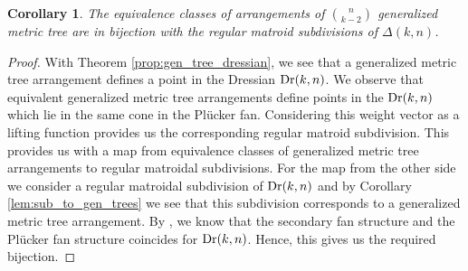\documentclass[12pt]{article}
\DeclareMathOperator{\Dr}{\rm Dr}
\theoremstyle{plain}
\newtheorem{corollary}[theorem]{Corollary}
\theoremstyle{definition}
\numberwithin{subcase}{case}
\begin{document}
\begin{corollary}
The equivalence classes of arrangements of $\binom{n}{k-2}$ generalized metric tree are in bijection with the regular matroid subdivisions of $\Delta(k,n)$.
\end{corollary}

\begin{proof}
With Theorem \ref{prop:gen_tree_dressian}, we see that a generalized metric tree arrangement defines a point in the Dressian $\Dr(k,n)$. We observe that equivalent generalized metric tree arrangements define points in the $\Dr(k,n)$ which lie in the same cone in the Pl\"ucker fan. Considering this weight vector as a lifting function provides us the corresponding regular matroid subdivision. This provides us with a map from equivalence classes of generalized metric tree arrangements to regular matroidal subdivisions. For the map from the other side we consider a regular matroidal subdivision of $\Dr(k,n)$ and by Corollary \ref{lem:sub_to_gen_trees} we see that this subdivision corresponds to a generalized metric tree arrangement. By \cite{olarte2019local}, we know that the secondary fan structure and the Pl\"ucker fan structure coincides for $\Dr(k,n)$. Hence, this gives us the required bijection.
\end{proof}
\end{document}
